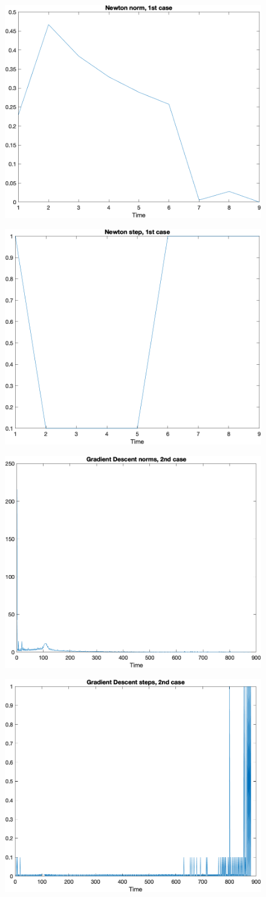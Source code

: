 \documentclass[10pt]{article}
\begin{document}
\begin{figure}[H]
	\centering
	\includegraphics[width=0.55\linewidth]{new1_norm.png}
\end{figure}
\begin{figure}[H]
	\centering
	\includegraphics[width=0.55\linewidth]{new1_step.png}
\end{figure}
\begin{figure}[H]
	\centering
	\includegraphics[width=0.55\linewidth]{gd2_norm.png}
\end{figure}
\begin{figure}[H]
	\centering
	\includegraphics[width=0.55\linewidth]{gd2_step.png}
\end{figure}
\end{document}
